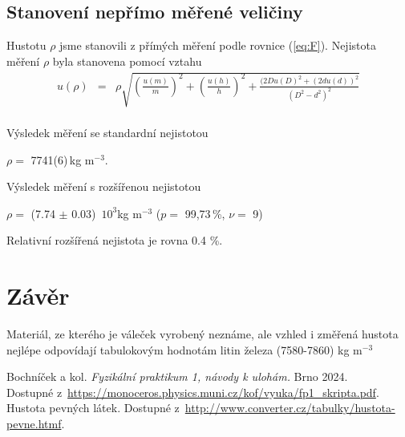 \documentclass[a4paper,11pt]{article}
\newcommand{\vsn}[4]{\ensuremath{#1 =} #2(#3)\,#4}
\newcommand{\vrn}[6]{\ensuremath{#1 =} (#2 $\pm$ #3)\,#4 ($p=$ #5\,\%, $\nu=$ #6)}
\begin{document}
\subsection{Stanovení nepřímo měřené veličiny}
Hustotu $\rho$ jsme stanovili z přímých měření podle rovnice (\ref{eq:F}). 
Nejistota měření $\rho$ byla stanovena pomocí vztahu
\begin{eqnarray}
  u(\rho) &=& \rho \sqrt{(\frac{u(m)}{m})^2 + (\frac{u(h)}{h})^2 + \frac{(2Du(D)^2 + (2du(d))^2 }{(D^2-d^2)^2}} \\
\end{eqnarray}

Výsledek měření se standardní nejistotou

\begin{center}
\vsn{\rho}{7741}{6}{kg m$^{-3}$}.
\end{center}

Výsledek měření s rozšířenou nejistotou

\begin{center}
  \vrn{\rho}{7.74}{0.03}{ $10^3$kg m$^{-3}$ }{99,73}{9}
\end{center}
Relativní rozšířená nejistota je rovna 0.4 \%.


\section{Závěr}
Materiál, ze kterého je váleček vyrobený neznáme, ale vzhled i změřená hustota nejlépe odpovídají 
tabulokovým hodnotám litin železa (7580-7860) kg m$^{-3}$


\begin{thebibliography}{0}
 Bochníček a kol. \textit{Fyzikální praktikum 1, návody k ulohám.} Brno 2024.\\ Dostupné z~\url{https://monoceros.physics.muni.cz/kof/vyuka/fp1_skripta.pdf}.   
 Hustota pevných látek. Dostupné z~\url{http://www.converter.cz/tabulky/hustota-pevne.htmf}.   

\end{thebibliography}


\end{document}
